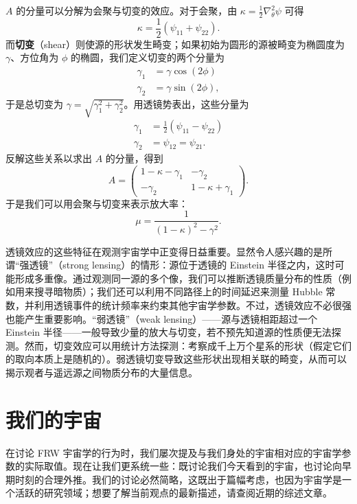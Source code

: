 $A$ 的分量可以分解为会聚与切变的效应。对于会聚，由 $\kappa=\frac{1}{2}\nabla_{\theta}^{2}\psi$ 可得
\begin{equation*}
\kappa = \frac{1}{2}(\psi_{11}+\psi_{22}).
\tag{8.150}
\end{equation*}
而\textbf{切变}（shear）则使源的形状发生畸变；如果初始为圆形的源被畸变为椭圆度为 $\gamma$、方位角为 $\phi$ 的椭圆，我们定义切变的两个分量为
\begin{align*}
\gamma_1 &= \gamma\cos(2\phi)\\
\gamma_2 &= \gamma\sin(2\phi),
\tag{8.151}
\end{align*}
于是总切变为 $\gamma=\sqrt{\gamma_1^{2}+\gamma_2^{2}}$。用透镜势表出，这些分量为
\begin{align*}
\gamma_1 &= \frac{1}{2}(\psi_{11}-\psi_{22})\\
\gamma_2 &= \psi_{12}=\psi_{21}.
\tag{8.152}
\end{align*}
反解这些关系以求出 $A$ 的分量，得到
\begin{equation*}
A = \begin{pmatrix} 1-\kappa-\gamma_1 & -\gamma_2\\ -\gamma_2 & 1-\kappa+\gamma_1 \end{pmatrix}.
\tag{8.153}
\end{equation*}
于是我们可以用会聚与切变来表示放大率：
\begin{equation*}
\mu = \frac{1}{(1-\kappa)^{2}-\gamma^{2}}.
\tag{8.154}
\end{equation*}

透镜效应的这些特征在观测宇宙学中正变得日益重要。显然令人感兴趣的是所谓“强透镜”（strong lensing）的情形：源位于透镜的 Einstein 半径之内，这时可能形成多重像。通过观测同一源的多个像，我们可以推断透镜质量分布的性质（例如用来搜寻暗物质）；我们还可以利用不同路径上的时间延迟来测量 Hubble 常数，并利用透镜事件的统计频率来约束其他宇宙学参数。不过，透镜效应不必很强也能产生重要影响。“弱透镜”（weak lensing）——源与透镜相距超过一个 Einstein 半径——一般导致少量的放大与切变，若不预先知道源的性质便无法探测。然而，切变效应可以用统计方法探测：考察成千上万个星系的形状（假定它们的取向本质上是随机的）。弱透镜切变导致这些形状出现相关联的畸变，从而可以揭示观者与遥远源之间物质分布的大量信息。

\section{我们的宇宙}

在讨论 FRW 宇宙学的行为时，我们屡次提及与我们身处的宇宙相对应的宇宙学参数的实际取值。现在让我们更系统一些：既讨论我们今天看到的宇宙，也讨论向早期时刻的合理外推。我们的讨论必然简略，这既出于篇幅考虑，也因为宇宙学是一个活跃的研究领域；想要了解当前观点的最新描述，请查阅近期的综述文章。

